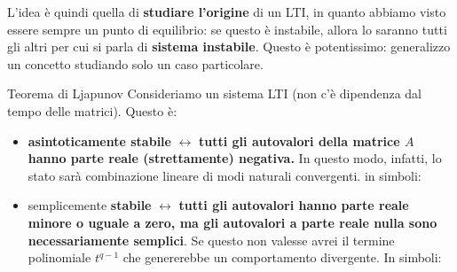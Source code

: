 \documentclass[a4paper]{report}
\begin{document}
L'idea è quindi quella di \textbf{studiare l'origine} di un LTI, in quanto abbiamo visto essere sempre un punto di equilibrio: se questo è instabile, allora lo saranno tutti gli altri per cui si parla di \textbf{sistema instabile}. Questo è potentissimo: generalizzo un concetto studiando solo un caso particolare.
\begin{defin}{Teorema di Ljapunov}{}
	Consideriamo un sistema LTI (non c'è dipendenza dal tempo delle matrici). Questo è:
	\begin{itemize}
		\item \textbf{asintoticamente stabile} $\leftrightarrow$ \textbf{tutti gli autovalori della matrice $A$ hanno parte reale (strettamente) negativa.} In questo modo, infatti, lo stato sarà combinazione lineare di modi naturali convergenti. in simboli: 
		\item semplicemente \textbf{stabile} $\leftrightarrow$ \textbf{tutti gli autovalori hanno parte reale minore o uguale a zero, ma gli autovalori a parte reale nulla sono necessariamente semplici}. Se questo non valesse avrei il termine polinomiale $t^{q-1}$ che  genererebbe un comportamento divergente. In simboli:  
	\end{itemize}
\end{defin}
\end{document}
